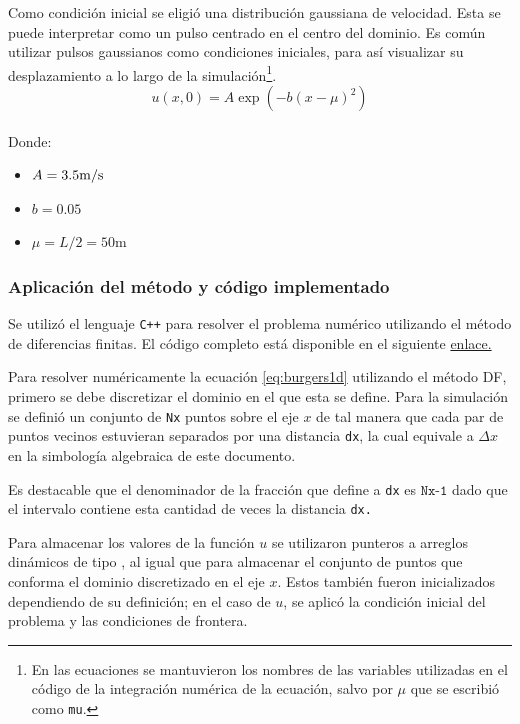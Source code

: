 \documentclass[12pt]{article}
\newcommand{\mpers}{\unit[per-mode = symbol]{\metre\per\second}}
\begin{document}
	Como condición inicial se eligió una distribución gaussiana de velocidad. Esta se puede interpretar como un pulso centrado en el centro del dominio. Es común utilizar pulsos gaussianos como condiciones iniciales, para así visualizar su desplazamiento a lo largo de la simulación\footnote{En las ecuaciones se mantuvieron los nombres de las variables utilizadas en el código de la integración numérica de la ecuación, salvo por $\mu$ que se escribió como \texttt{mu}.}.
	\begin{equation}
		u(x,0) = A\exp(-b(x-\mu)^{2})
		\label{eq:condinicial}
	\end{equation}
	\\
	Donde:
	\begin{itemize}
		\item $A=3.5\mpers$
		\item $b=0.05$
		\item $\mu=L/2=50\unit{\meter}$
	\end{itemize}

	\subsubsection{Aplicación del método y código implementado}
	Se utilizó el lenguaje \texttt{C++} para resolver el problema numérico utilizando el método de diferencias finitas. El código completo está disponible en el siguiente \href{https://github.com/highchen147/practicas/blob/main/burgers1DDF/burgers1DDF.cpp}{enlace.}
	
	
	Para resolver numéricamente la ecuación \ref{eq:burgers1d} utilizando el método DF, primero se debe discretizar el dominio en el que esta se define. Para la simulación se definió un conjunto de \texttt{Nx} puntos sobre el eje $x$ de tal manera que cada par de puntos vecinos estuvieran separados por una distancia \texttt{dx}, la cual equivale a $\Delta x$ en la simbología algebraica de este documento.
	
	
	
	Es destacable que el denominador de la fracción que define a \texttt{dx} es $\texttt{Nx-1}$ dado que el intervalo contiene esta cantidad de veces la distancia \texttt{dx.} 

	Para almacenar los valores de la función $u$ se utilizaron punteros a arreglos dinámicos de tipo \texttt{\color{blue}{double}}, al igual que para almacenar el conjunto de puntos que conforma el dominio discretizado en el eje $x$. Estos también fueron inicializados dependiendo de su definición; en el caso de $u$, se aplicó la condición inicial del problema y las condiciones de frontera.	
	
\end{document}
